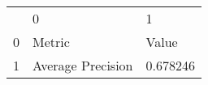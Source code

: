 \begin{tabular}{lll}
 & 0 & 1 \\
0 & Metric & Value \\
1 & Average Precision & 0.678246 \\
\end{tabular}
